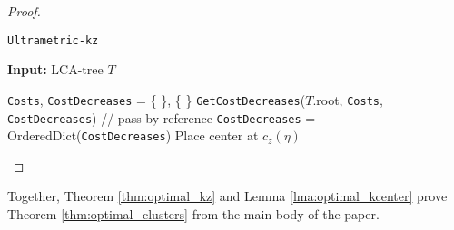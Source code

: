 \begin{proof}
    \begin{algorithm}
        \caption{\texttt{Ultrametric-kz}}\label{alg:ultrametric_kz}
    \textbf{Input:} LCA-tree $T$
    \begin{algorithmic}[1]
        \State \texttt{Costs}, \texttt{CostDecreases} = \{ \}, \{ \}
        \State \texttt{GetCostDecreases}($T$.root, \texttt{Costs}, \texttt{CostDecreases}) // pass-by-reference
        \State \texttt{CostDecreases} = OrderedDict(\texttt{CostDecreases})
            \State Place center at $c_z(\eta)$
        \EndFor
    \end{algorithmic}
    \end{algorithm}

\end{proof}

Together, Theorem \ref{thm:optimal_kz} and Lemma \ref{lma:optimal_kcenter} prove Theorem \ref{thm:optimal_clusters} from the main body of the paper.



